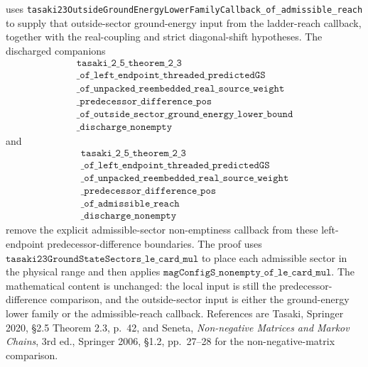 \documentclass[a4paper,11pt]{article}
\begin{document}
uses
\texttt{tasaki23OutsideGroundEnergyLowerFamilyCallback\_of\_admissible\_reach}
to supply that outside-sector ground-energy input from the
ladder-reach callback, together with the real-coupling and strict
diagonal-shift hypotheses.
The discharged companions
\[
\begin{gathered}
\texttt{tasaki\_2\_5\_theorem\_2\_3}\\
\texttt{\_of\_left\_endpoint\_threaded\_predictedGS}\\
\texttt{\_of\_unpacked\_reembedded\_real\_source\_weight}\\
\texttt{\_predecessor\_difference\_pos}\\
\texttt{\_of\_outside\_sector\_ground\_energy\_lower\_bound}\\
\texttt{\_discharge\_nonempty}
\end{gathered}
\]
and
\[
\begin{gathered}
\texttt{tasaki\_2\_5\_theorem\_2\_3}\\
\texttt{\_of\_left\_endpoint\_threaded\_predictedGS}\\
\texttt{\_of\_unpacked\_reembedded\_real\_source\_weight}\\
\texttt{\_predecessor\_difference\_pos}\\
\texttt{\_of\_admissible\_reach}\\
\texttt{\_discharge\_nonempty}
\end{gathered}
\]
remove the explicit admissible-sector non-emptiness callback from these
left-endpoint predecessor-difference boundaries.  The proof uses
\(\texttt{tasaki23GroundStateSectors\_le\_card\_mul}\) to place each
admissible sector in the physical range and then applies
\(\texttt{magConfigS\_nonempty\_of\_le\_card\_mul}\).  The mathematical
content is unchanged: the local input is still the predecessor-difference
comparison, and the outside-sector input is either the ground-energy lower
family or the admissible-reach callback.  References are Tasaki,
Springer 2020, \S2.5 Theorem 2.3, p.~42, and Seneta,
\emph{Non-negative Matrices and Markov Chains}, 3rd ed., Springer 2006,
\S1.2, pp.~27--28 for the non-negative-matrix comparison.
\end{document}
